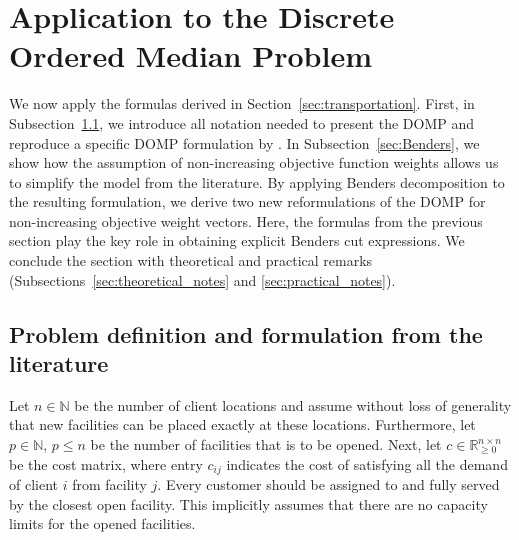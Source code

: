 \documentclass[letterpaper]{article}
\begin{document}
\section{Application to the Discrete Ordered Median Problem}\label{sec:application_to_domp}
We now apply the formulas derived in Section~\ref{sec:transportation}. First, in Subsection~\ref{sec:DOMP_definition}, we introduce all notation needed to present the DOMP and reproduce a specific DOMP formulation by \citet{labbe_comparative_2017}. In Subsection~\ref{sec:Benders}, we show how the assumption of non-increasing objective function weights allows us to simplify the model from the literature. By applying Benders decomposition to the resulting formulation, we derive two new reformulations of the DOMP for non-increasing objective weight vectors. Here, the formulas from the previous section play the key role in obtaining explicit Benders cut expressions. We conclude the section with theoretical and practical remarks (Subsections~\ref{sec:theoretical_notes} and \ref{sec:practical_notes}).


\subsection{Problem definition and formulation from the literature}\label{sec:DOMP_definition}
Let $n \in \mathbb{N}$ be the number of client locations and assume without loss of generality that new facilities can be placed exactly at these locations. Furthermore, let $p \in \mathbb{N}$, $p \leq n$ be the number of facilities that is to be opened. Next, let $c \in \mathbb{R}_{\geq 0}^{n \times n}$ be the cost matrix, where entry $c_{ij}$ indicates the cost of satisfying all the demand of client $i$ from facility $j$. Every customer should be assigned to and fully served by the closest open facility. This implicitly assumes that there are no capacity limits for the opened facilities.
\end{document}
